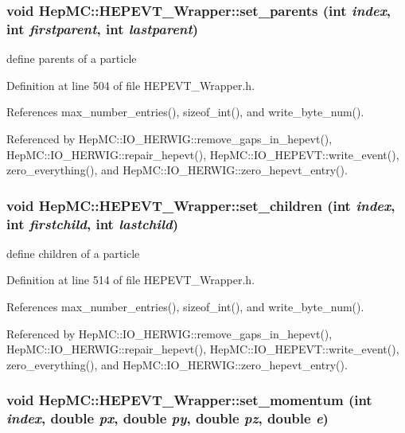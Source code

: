 \subsubsection{\setlength{\rightskip}{0pt plus 5cm}void Hep\-MC::HEPEVT\_\-Wrapper::set\_\-parents (int {\em index}, int {\em firstparent}, int {\em lastparent})\hspace{0.3cm}{\tt  [inline, static]}}\label{classHepMC_1_1HEPEVT__Wrapper_f7ddc2d98d6854d90eb9f910246e29ed}


define parents of a particle 



Definition at line 504 of file HEPEVT\_\-Wrapper.h.

References max\_\-number\_\-entries(), sizeof\_\-int(), and write\_\-byte\_\-num().

Referenced by Hep\-MC::IO\_\-HERWIG::remove\_\-gaps\_\-in\_\-hepevt(), Hep\-MC::IO\_\-HERWIG::repair\_\-hepevt(), Hep\-MC::IO\_\-HEPEVT::write\_\-event(), zero\_\-everything(), and Hep\-MC::IO\_\-HERWIG::zero\_\-hepevt\_\-entry().
\subsubsection{\setlength{\rightskip}{0pt plus 5cm}void Hep\-MC::HEPEVT\_\-Wrapper::set\_\-children (int {\em index}, int {\em firstchild}, int {\em lastchild})\hspace{0.3cm}{\tt  [inline, static]}}\label{classHepMC_1_1HEPEVT__Wrapper_03d1459146dfa6bd05b7b1db4bd784eb}


define children of a particle 



Definition at line 514 of file HEPEVT\_\-Wrapper.h.

References max\_\-number\_\-entries(), sizeof\_\-int(), and write\_\-byte\_\-num().

Referenced by Hep\-MC::IO\_\-HERWIG::remove\_\-gaps\_\-in\_\-hepevt(), Hep\-MC::IO\_\-HERWIG::repair\_\-hepevt(), Hep\-MC::IO\_\-HEPEVT::write\_\-event(), zero\_\-everything(), and Hep\-MC::IO\_\-HERWIG::zero\_\-hepevt\_\-entry().
\subsubsection{\setlength{\rightskip}{0pt plus 5cm}void Hep\-MC::HEPEVT\_\-Wrapper::set\_\-momentum (int {\em index}, double {\em px}, double {\em py}, double {\em pz}, double {\em e})\hspace{0.3cm}{\tt  [inline, static]}}\label{classHepMC_1_1HEPEVT__Wrapper_31b65abdc8bfc12354bd52a72fe75aaa}


